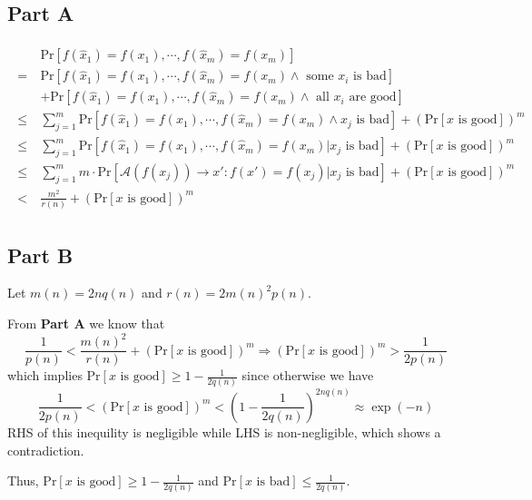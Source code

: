 \documentclass[8pt]{article}
\theoremstyle{compact}
\def\le{\leqslant}
\def\ge{\geqslant}
\begin{document}
\subsection*{Part A}
\begin{align*}
	\begin{split}
		&\text{Pr}[f(\hat x_1) = f(x_1), \cdots, f(\hat x_m) = f(x_m)] \\= \ & \text{Pr}[f(\hat x_1) = f(x_1), \cdots, f(\hat x_m) = f(x_m) \wedge \text{ some } x_i \text{ is bad}] \\&+ \text{Pr}[f(\hat x_1) = f(x_1), \cdots, f(\hat x_m) = f(x_m) \wedge \text{ all } x_i \text{ are good}] \\ \le\ & \sum_{j=1}^{m}\text{Pr}[f(\hat x_1) = f(x_1), \cdots, f(\hat x_m) = f(x_m) \wedge x_j \text{ is bad}] + \left(\text{Pr}[x \text{ is good}]\right)^m \\ \le\ & \sum_{j=1}^{m}\text{Pr}[f(\hat x_1) = f(x_1), \cdots, f(\hat x_m) = f(x_m) | x_j \text{ is bad}] + \left(\text{Pr}[x \text{ is good}]\right)^m \\ \le\ & \sum_{j=1}^{m}m \cdot \text{Pr}[\mathcal A(f(x_j)) \to x': f(x') = f(x_j) | x_j \text{ is bad}] + \left(\text{Pr}[x \text{ is good}]\right)^m \\ < \ & \frac{m^2}{r(n)} + \left(\text{Pr}[x \text{ is good}]\right)^m
	\end{split}
\end{align*}
\subsection*{Part B}
Let $m(n) = 2nq(n)$ and $r(n) = 2m(n)^2p(n)$.

From \textbf{Part A} we know that $$\frac{1}{p(n)} < \frac{m(n)^2}{r(n)} + \left(\text{Pr}[x \text{ is good}]\right)^m \Rightarrow \left(\text{Pr}[x \text{ is good}]\right)^m > \frac{1}{2p(n)}$$
which implies $\text{Pr}[x \text{ is good}] \ge 1 - \frac{1}{2q(n)}$ since otherwise we have $$\frac{1}{2p(n)} < \left(\text{Pr}[x \text{ is good}]\right)^m < \left(1 - \frac{1}{2q(n)}\right)^{2nq(n)} \approx \exp(-n)$$ RHS of this inequility is negligible while LHS is non-negligible, which shows a contradiction.

Thus, $\text{Pr}[x \text{ is good}] \ge 1 - \frac{1}{2q(n)}$ and $\text{Pr}[x \text{ is bad}] \le \frac{1}{2q(n)}$.
\end{document}
